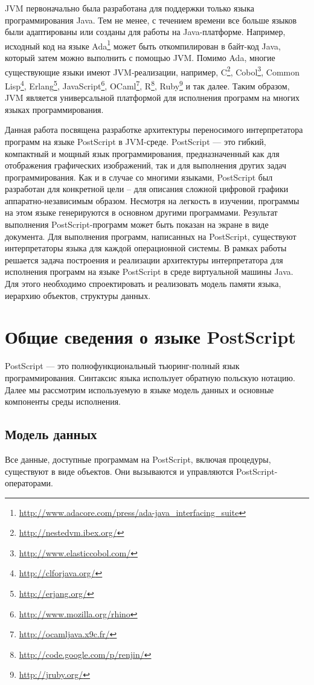 JVM первоначально была разработана для поддержки только языка программирования Java. Тем не менее, с течением времени все больше языков были адаптированы или созданы  для работы на Java-платформе. Например, исходный код на языке Ada\footnote{\url{http://www.adacore.com/press/ada-java\_interfacing\_suite}} может быть откомпилирован в байт-код Java, который затем можно выполнить с помощью JVM. Помимо Ada, многие существующие языки имеют JVM-реализации, например, C\footnote{\url{http://nestedvm.ibex.org/}}, Cobol\footnote{\url{http://www.elasticcobol.com/}}, Common Lisp\footnote{\url{http://clforjava.org/}}, Erlang\footnote{\url{http://erjang.org/}}, JavaScript\footnote{\url{http://www.mozilla.org/rhino}}, OCaml\footnote{\url{http://ocamljava.x9c.fr/}}, R\footnote{\url{http://code.google.com/p/renjin/}}, Ruby\footnote{\url{http://jruby.org/}} и так далее. Таким образом, JVM является универсальной платформой для исполнения программ на многих языках программирования. 

Данная работа посвящена разработке архитектуры переносимого интерпретатора программ на языке PostScript \cite{plrm} в JVM-среде. PostScript —  это гибкий,  компактный и мощный язык	программирования, предназначенный как для отображения графических изображений, так и для выполнения других задач программирования. Как и в случае со многими языками, PostScript был разработан для конкретной цели – для описания сложной цифровой графики аппаратно-независимым образом. Несмотря на легкость в изучении, программы на этом языке генерируются в основном другими программами. Результат выполнения PostScript-программ может быть показан на экране в виде документа. Для выполнения программ, написанных на PostScript, существуют интерпретаторы языка для каждой  операционной системы.
В рамках работы решается задача построения и реализации архитектуры интерпретатора для исполнения программ на языке PostScript в среде виртуальной машины Java. Для этого необходимо спроектировать и реализовать модель памяти языка, иерархию объектов, структуры данных.

\section{Общие сведения о языке PostScript}
PostScript --- это полнофункциональный тьюринг-полный язык программирования. Синтаксис языка использует обратную польскую нотацию. Далее мы рассмотрим используемую в языке модель данных и основные компоненты среды исполнения.

\subsection{Модель данных}
Все данные, доступные программам на PostScript, включая процедуры, существуют в виде объектов. Они вызываются и управляются  PostScript-операторами. 

